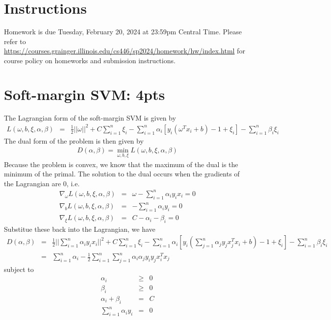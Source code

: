 \documentclass[12pt]{article}
\begin{document}
\singlespacing

\renewcommand{\familydefault}{\rmdefault}


\section{Instructions}

Homework is due Tuesday, February 20, 2024 at 23:59pm Central Time.
Please refer to \url{https://courses.grainger.illinois.edu/cs446/sp2024/homework/hw/index.html} for course policy on homeworks and submission instructions.

\section{Soft-margin SVM: 4pts}
The Lagrangian form of the soft-margin SVM is given by
\begin{eqnarray}
    L(\omega, b, \xi, \alpha, \beta) &=& \frac{1}{2}||\omega||^2 + C\sum_{i=1}^n \xi_i - \sum_{i=1}^n \alpha_i[y_i(\omega^Tx_i + b) - 1 + \xi_i] - \sum_{i=1}^n \beta_i\xi_i \nonumber
\end{eqnarray}
The dual form of the problem is then given by
\begin{eqnarray}
    D(\alpha, \beta) = \min_{\omega, b, \xi} L(\omega, b, \xi, \alpha, \beta) \nonumber
\end{eqnarray}
Because the problem is convex, we know that the maximum of the dual is the minimum of the primal. The solution to the dual occurs when the gradients of the Lagrangian are 0, i.e.
\begin{eqnarray}
    \nabla_{\omega}L(\omega, b, \xi, \alpha, \beta) &=& \omega - \sum_{i=1}^n \alpha_iy_ix_i = 0 \nonumber \\
    \nabla_{b}L(\omega, b, \xi, \alpha, \beta) &=& -\sum_{i=1}^n \alpha_iy_i = 0 \nonumber \\
    \nabla_{\xi}L(\omega, b, \xi, \alpha, \beta) &=& C - \alpha_i - \beta_i = 0 \nonumber
\end{eqnarray}
Substitue these back into the Lagrangian, we have
\begin{eqnarray}
    D(\alpha, \beta) &=& \frac{1}{2}||\sum_{i=1}^n \alpha_iy_ix_i||^2 + C\sum_{i=1}^n \xi_i - \sum_{i=1}^n \alpha_i[y_i(\sum_{j=1}^n \alpha_jy_jx_j^Tx_i + b) - 1 + \xi_i] - \sum_{i=1}^n \beta_i\xi_i \nonumber
    \\ &=& \sum_{i=1}^n \alpha_i - \frac{1}{2}\sum_{i=1}^n\sum_{j=1}^n\alpha_i\alpha_jy_iy_jx_i^Tx_j \nonumber 
\end{eqnarray}
subject to
\begin{eqnarray}
    \alpha_i &\geq& 0 \nonumber \\
    \beta_i &\geq& 0 \nonumber \\
    \alpha_i + \beta_i &=& C \nonumber \\
    \sum_{i=1}^n \alpha_iy_i &=& 0 \nonumber
\end{eqnarray}
\newpage
\end{document}
